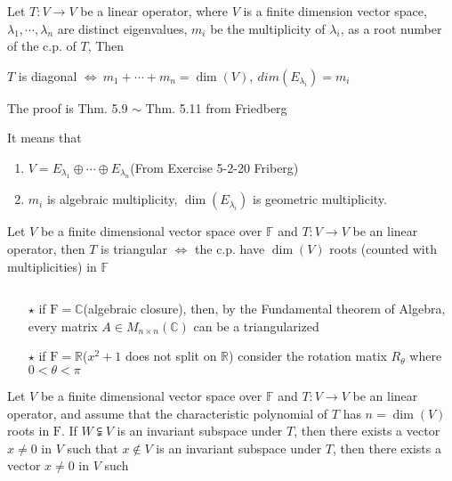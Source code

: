 \begin{tcolorbox}
	Let $T:V \rightarrow V$ be a linear operator, where $V$ is a finite dimension vector space, $\lambda_1,\cdots,\lambda_n$ are distinct eigenvalues, $m_i$ be the multiplicity of $\lambda_i$, as a root number of the c.p. of $T$, Then
	
	\begin{center}
		$T$ is diagonal $\Leftrightarrow ~ m_1+\cdots+m_n = \dim(V),~dim(E_{\lambda_i}) = m_i$ 
	\end{center} 
	
	The proof is Thm. 5.9 $\sim$ Thm. 5.11 from Friedberg
	
	It means that 
	
	\begin{enumerate}
		\item $V = E_{\lambda_1} \oplus \cdots \oplus E_{\lambda_n}$(From Exercise 5-2-20 Friberg)
		\item $m_i$ is algebraic multiplicity, $\dim(E_{\lambda_i})$ is geometric multiplicity.
	\end{enumerate}
\end{tcolorbox}

\begin{thm*}[Schur]
	Let $V$ be a finite dimensional vector space over $\mathbb F$ and $T:V \rightarrow V$ be an linear operator, then $T$ is triangular $\Leftrightarrow$ the c.p. have $\dim(V)$ roots (counted with multiplicities) in $\mathbb F$
\end{thm*}

\begin{rmk*} $ $
	\begin{enumerate}
		\item[$\star$] if $\mathrm F = \mathbb C$(algebraic closure), then, by the Fundamental theorem of Algebra, every matrix $A \in M_{n \times n}(\mathbb C)$ can be a triangularized
		\item[$\star$] if $\mathrm F = \mathbb R$($x^2 + 1$ does not split on $\mathbb R$) consider the rotation matix $R_{\theta}$ where $0<\theta < \pi$
	\end{enumerate}
\end{rmk*}

\begin{lmma*}
	Let $V$ be a finite dimensional vector space over $\mathbb F$ and $T:V \rightarrow V$ be an linear operator, and assume that the characteristic polynomial of $T$ has $n = \dim(V)$ roots in $\mathrm F$. If $W \subsetneqq V$ is an invariant subspace under $T$, then there exists a vector $x \neq 0$ in $V$ such that $x \notin V$ is an invariant subspace under $T$, then there exists a vector $x \neq 0$ in $V$ such 

\end{lmma*}

